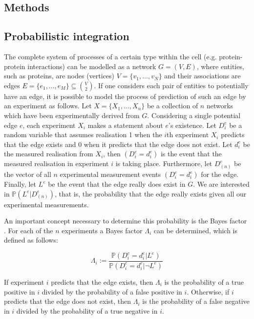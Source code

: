 \documentclass{bioinfo}
\newcommand{\prob}{\mathbb{P}}
\begin{document}
\begin{methods}
\section{Methods}

\subsection{Probabilistic integration}

The complete system of processes of a certain type within the cell (e.g. protein-protein interactions) can be modelled as a network $G=(V,E)$, where entities, such as proteins, are nodes (vertices) $V=\{v_1,\ldots,v_N\}$ and their associations are edges $E = \{e_1, \ldots,e_M\} \subseteq \binom{V}{2}$. If one considers each pair of entities to potentially have an edge, it is possible to model the process of prediction of such an edge by an experiment as follows. Let $X = \{X_1, \ldots, X_n \}$ be a collection of $n$ networks which have been experimentally derived from $G$. Considering a single potential edge $e$, each experiment $X_i$ makes a statement about $e$'s existence. Let $D^e_i$ be a random variable that assumes realisation 1 when the $i$th experiment $X_i$ predicts that the edge exists and 0 when it predicts that the edge does not exist. Let $d^e_i$ be the measured realisation from $X_i$, then $(D^e_i=d^e_i)$ is the event that the measured realisation in experiment $i$ is taking place. Furthermore, let $D^e_{(n)}$ be the vector of all $n$ experimental measurement events $(D^e_i=d^e_i)$ for the edge. Finally, let $L^e$ be the event that the edge really does exist in $G$. We are interested in $\prob(L^e|D^e_{(n)})$, that is, the probability that the edge really exists given all our experimental measurements.

An important concept necessary to determine this probability is the Bayes factor \citep{kass_bayes_1995}. For each of the $n$ experiments a Bayes factor $\Lambda_i$ can be determined, which is defined as follows:

\begin{equation} 
	 \Lambda_i := \frac{\prob(D^e_i=d^e_i|L^e)}{\prob(D^e_i=d^e_i|\neg L^e)} 
\end{equation}

If experiment $i$ predicts that the edge exists, then $\Lambda_i$ is the probability of a true positive in $i$ divided by the probability of a false positive in $i$. Otherwise, if $i$ predicts that the edge does not exist, then $\Lambda_i$ is the probability of a false negative in $i$ divided by the probability of a true negative in $i$.


\end{methods}
\end{document}
